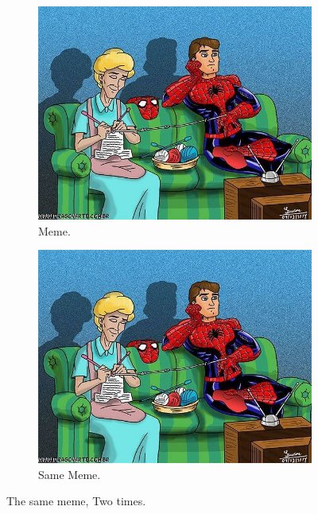 \documentclass{article}
\begin{document}
    \begin{figure}[h!]
    \centering
    \begin{subfigure}[b]{0.4\linewidth}
        \includegraphics[width=\linewidth]{pic.png}
        \caption{Meme.}
    \end{subfigure}
    \begin{subfigure}[b]{0.4\linewidth}
        \includegraphics[width=\linewidth]{pic.png}
        \caption{Same Meme.}
    \end{subfigure}
    \caption{The same meme, Two times.}
    \label{fig:coffee}
    \end{figure}
\end{document}
